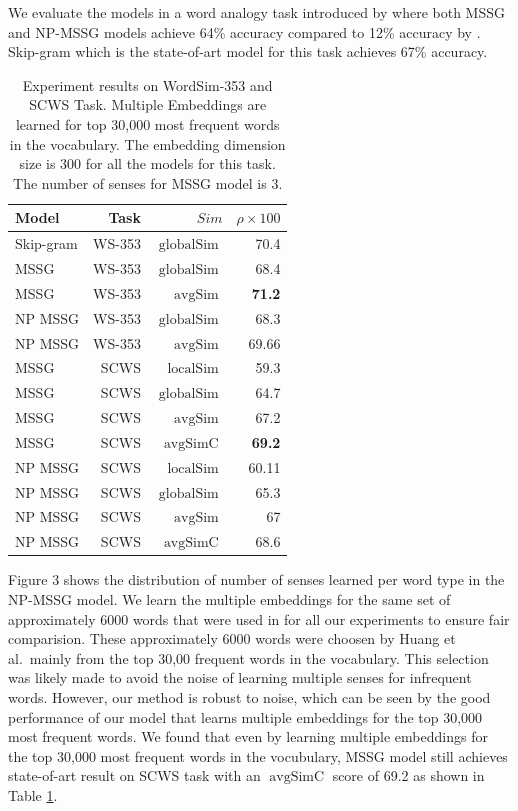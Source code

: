 \documentclass[11pt,a4paper]{article}
\DeclareMathOperator*{\avgSim}{avgSim}
\DeclareMathOperator*{\avgSimC}{avgSimC}
\DeclareMathOperator*{\globalSim}{globalSim}
\DeclareMathOperator*{\localSim}{localSim}
\begin{document}
We evaluate the models in a word analogy task introduced by
 where both MSSG and NP-MSSG models achieve 64\% accuracy compared to
12\% accuracy by . Skip-gram which is the state-of-art model for this task achieves 67\% accuracy.
\begin{table}
\centering
\begin{tabular}{|l|r|r|r|}
\hline
Model & Task & $Sim$ & $\rho \times 100$ \\ \hline
Skip-gram & WS-353 & $\globalSim$ & 70.4 \\ \hline
MSSG & WS-353 & $\globalSim$ & 68.4 \\ \hline
MSSG& WS-353 & $\avgSim$ & \textbf{71.2} \\  \hline
NP MSSG & WS-353 & $\globalSim$ & 68.3\\ \hline
NP MSSG & WS-353 & $\avgSim$ &  69.66 \\ \hline \hline
MSSG & SCWS & $\localSim$  & 59.3 \\ \hline
MSSG & SCWS & $\globalSim$ &  64.7\\ \hline 
MSSG & SCWS & $\avgSim$ & 67.2 \\ \hline
MSSG & SCWS & $\avgSimC$ & \textbf{69.2} \\ \hline
NP MSSG & SCWS & $\localSim$ & 60.11\\ \hline
NP MSSG & SCWS & $\globalSim$ & 65.3 \\ \hline
NP MSSG & SCWS & $\avgSim$ & 67 \\ \hline
NP MSSG & SCWS & $\avgSimC$ & 68.6 \\ \hline
\end{tabular}
\caption{Experiment results on WordSim-353 and SCWS Task. Multiple Embeddings are learned for top 30,000 most frequent words in the vocabulary. The embedding dimension size is 300 for all the models for this task. The number of senses for MSSG model is 3.}
\label{table:30k-word-sim-task}
\end{table}



Figure 3 shows the distribution of number of senses learned
per word type in the  NP-MSSG model.  
We learn the multiple embeddings
for the same set of approximately 6000 words that were used in
 for all our experiments to ensure fair
comparision. These approximately 6000 words were choosen by Huang et al.\ mainly
from the top 30,00 frequent words in the vocabulary.  This selection
was likely made to avoid the noise of learning multiple senses for infrequent words. However, our
method is robust to noise, which can be seen by the good performance of
our model that learns multiple embeddings for the top 30,000 most
frequent words.  We found that even by learning multiple embeddings
for the top 30,000 most frequent words in the vocubulary, MSSG model
still achieves state-of-art result on SCWS task with an $\avgSimC$
score of 69.2 as shown in Table \ref{table:30k-word-sim-task}.  
\end{document}
